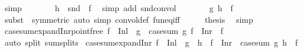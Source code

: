 \begin{isabellebody}
\ simp\isanewline
\ \ \isamarkupfalse%
\ \isamarkupfalse%
\ {\isachardoublequoteopen}{\isasymdots}\ {\isasymlongleftrightarrow}\ h\ {\isacharequal}{\kern0pt}\ snd\ {\isasymcirc}\ f{\isachardoublequoteclose}\ \isamarkupfalse%
\ {\isacharparenleft}{\kern0pt}simp\ add{\isacharcolon}{\kern0pt}\ snd{\isacharunderscore}{\kern0pt}convol{\isacharparenright}{\kern0pt}\isanewline
\ \ \isamarkupfalse%
\ \isamarkupfalse%
\ {\isachardoublequoteopen}{\isasymdots}\ {\isasymlongleftrightarrow}\ {\isasymlangle}g{\isacharcomma}{\kern0pt}\ h{\isasymrangle}\ {\isacharequal}{\kern0pt}\ f{\isachardoublequoteclose}\ \isamarkupfalse%
\ {\isacharparenleft}{\kern0pt}subst\ {\isacharparenleft}{\kern0pt}{}{\isacharparenright}{\kern0pt}\ {\isacharasterisk}{\kern0pt}{\isacharbrackleft}{\kern0pt}symmetric{\isacharbrackright}{\kern0pt}{\isacharparenright}{\kern0pt}\ {\isacharparenleft}{\kern0pt}auto\ simp{\isacharcolon}{\kern0pt}\ convol{\isacharunderscore}{\kern0pt}def\ fun{\isacharunderscore}{\kern0pt}eq{\isacharunderscore}{\kern0pt}iff{\isacharparenright}{\kern0pt}\isanewline
\ \ \isamarkupfalse%
\ \isamarkupfalse%
\ {\isacharquery}{\kern0pt}thesis\ \isamarkupfalse%
\ simp\isanewline
{}\isamarkupfalse%
%
\endisatagproof
{\isafoldproof}%
%
\isadelimproof
\isanewline
%
\endisadelimproof
\isanewline
{}\isamarkupfalse%
\ case{\isacharunderscore}{\kern0pt}sum{\isacharunderscore}{\kern0pt}expand{\isacharunderscore}{\kern0pt}Inr{\isacharunderscore}{\kern0pt}pointfree{\isacharcolon}{\kern0pt}\ {\isachardoublequoteopen}f\ {\isasymcirc}\ Inl\ {\isacharequal}{\kern0pt}\ g\ {\isasymLongrightarrow}\ case{\isacharunderscore}{\kern0pt}sum\ g\ {\isacharparenleft}{\kern0pt}f\ {\isasymcirc}\ Inr{\isacharparenright}{\kern0pt}\ {\isacharequal}{\kern0pt}\ f{\isachardoublequoteclose}\isanewline
%
\isadelimproof
\ \ %
\endisadelimproof
%
\isatagproof
{}\isamarkupfalse%
\ {\isacharparenleft}{\kern0pt}auto\ split{\isacharcolon}{\kern0pt}\ sum{\isachardot}{\kern0pt}splits{\isacharparenright}{\kern0pt}%
\endisatagproof
{\isafoldproof}%
%
\isadelimproof
\isanewline
%
\endisadelimproof
\isanewline
{}\isamarkupfalse%
\ case{\isacharunderscore}{\kern0pt}sum{\isacharunderscore}{\kern0pt}expand{\isacharunderscore}{\kern0pt}Inr{\isacharprime}{\kern0pt}{\isacharcolon}{\kern0pt}\ {\isachardoublequoteopen}f\ {\isasymcirc}\ Inl\ {\isacharequal}{\kern0pt}\ g\ {\isasymLongrightarrow}\ h\ {\isacharequal}{\kern0pt}\ f\ {\isasymcirc}\ Inr\ {\isasymlongleftrightarrow}\ case{\isacharunderscore}{\kern0pt}sum\ g\ h\ {\isacharequal}{\kern0pt}\ f{\isachardoublequoteclose}\isanewline

\end{isabellebody}
